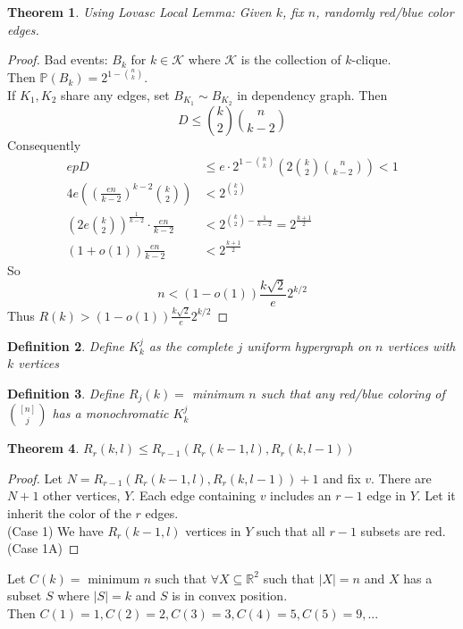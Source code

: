 \documentclass[a4paper]{article}
\newtheorem{thm}{Theorem}[section]
\newtheorem{defn}[thm]{Definition}
\begin{document}
\begin{thm}
    Using Lovasc Local Lemma: Given $k$, fix $n$, randomly red/blue color edges.
\end{thm}
\begin{proof}
    Bad events: $B_k$ for $k\in \mathcal{K}$ where $\mathcal{K}$ is the collection of $k$-clique. \\
    Then $\mathbb{P}(B_k)=2^{1-{n \choose k}}.$\\
    If $K_1,K_2$ share any edges, set $B_{K_1}\sim B_{K_2}$ in dependency graph. Then $$D\leq {k \choose 2}{n \choose k-2}$$
    Consequently 
    \begin{align*}
        epD&\leq e\cdot 2^{1-{n \choose k}}\left (2 {k \choose 2}{n \choose k-2}\right )<1 \\
        4e\left (\left (\frac{en}{k-2} \right )^{k-2}{k \choose 2}  \right ) &<2^{k \choose 2} \\
        \left (2e{k \choose 2} \right )^{\frac{1}{k-2}}\cdot {\frac{en}{k-2}}&<2^{{k \choose 2}-\frac{1}{k-2}}=2^{\frac{k+1}{2}}\\
        (1+o(1))\frac{en}{k-2}&<2^{\frac{k+1}{2}}
    \end{align*}
    So $$n<(1-o(1))\frac{k\sqrt{2}}{e}2^{k/2}$$
    Thus $R(k)>(1-o(1))\frac{k\sqrt{2}}{e}2^{k/2}$
\end{proof}
\begin{defn}
    Define $K_k^j$ as the complete $j$ uniform hypergraph on $n$ vertices with $k$ vertices
\end{defn}
\begin{defn}
    Define $R_j(k)=$ minimum $n$ such that any red/blue coloring of ${[n] \choose j}$ has a monochromatic $K_k^j$ 
\end{defn}
\begin{thm}
    $R_r(k,l)\leq R_{r-1}(R_r(k-1,l),R_r(k,l-1))$
\end{thm}
\begin{proof}
    Let $N=R_{r-1}(R_r(k-1,l),R_r(k,l-1))+1$ and fix $v$. There are $N+1$ other vertices, $Y$. Each edge containing $v$ includes an $r-1$ edge in $Y.$ Let it inherit the color of the $r$ edges.\\
    (Case 1) We have $R_r(k-1,l)$ vertices in $Y$ such that all $r-1$ subsets are red. 
    (Case 1A)
\end{proof}
\noindent Let $C(k)=$ minimum $n$ such that $\forall X \subseteq \mathbb{R}^2$ such that $|X|=n$ and $X$ has a subset $S$ where $|S|=k$ and $S$ is in convex position.\\
Then $C(1)=1, C(2)=2, C(3)=3, C(4)=5,C(5)=9,...$
\end{document}

